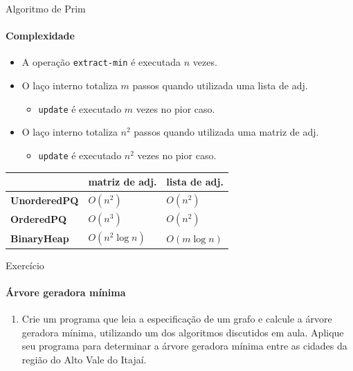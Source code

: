 \begin{frame}{Algoritmo de Prim}
	\framesubtitle{Complexidade}
	
	\begin{itemize}
		\item A operação \texttt{extract-min} é executada $n$ vezes.
		\item O laço interno totaliza $m$ passos quando utilizada uma lista de adj.
		\begin{itemize}
			\item \texttt{update} é executado $m$ vezes no pior caso.
		\end{itemize}
		
		\item O laço interno totaliza $n^2$ passos quando utilizada uma matriz de adj.
		\begin{itemize}
			\item \texttt{update} é executado $n^2$ vezes no pior caso.
		\end{itemize}
	\end{itemize}

	\begin{table}
		\begin{tabular}{l|ll}
			& \textbf{matriz de adj.} & \textbf{lista de adj.} \\
			\hline
			\textbf{UnorderedPQ} & $O(n^2)$ & $O(n^2)$ \\
			\textbf{OrderedPQ} & $O(n^3)$ & $O(n^2)$ \\
			\textbf{BinaryHeap} & $O(n^2 \log n)$ & $O(m \log n)$ \\
		\end{tabular}
	\end{table}
\end{frame}



\begin{frame}{Exercício}
	\framesubtitle{Árvore geradora mínima}
	
	\begin{enumerate}
		\item Crie um programa que leia a especificação de um grafo e calcule a árvore geradora mínima, utilizando um dos algoritmos discutidos em aula. Aplique seu programa para determinar a árvore geradora mínima entre as cidades da região do Alto Vale do Itajaí.
	\end{enumerate}
\end{frame}



